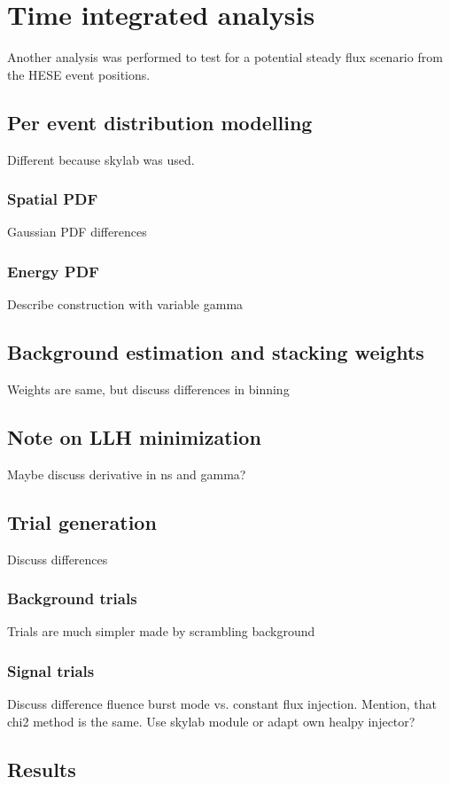 \chapter{Time integrated analysis}

Another analysis was performed to test for a potential steady flux scenario from the HESE event positions.


\section{Per event distribution modelling}
Different because skylab was used.

\subsection*{Spatial PDF}
Gaussian PDF differences

\subsection*{Energy PDF}
Describe construction with variable gamma


\section{Background estimation and stacking weights}
Weights are same, but discuss differences in binning


\section{Note on LLH minimization}
Maybe discuss derivative in ns and gamma?


\section{Trial generation}
Discuss differences

\subsection*{Background trials}
Trials are much simpler made by scrambling background

\subsection*{Signal trials}
Discuss difference fluence burst mode vs. constant flux injection.
Mention, that chi2 method is the same.
Use skylab module or adapt own healpy injector?


\section{Results}
